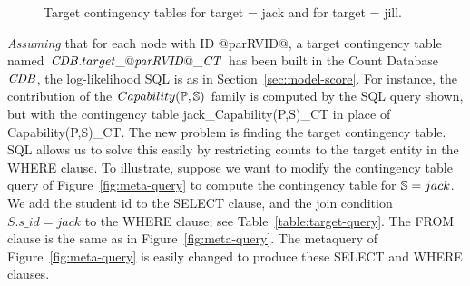 \begin{figure}[htbp] %
 \centering
{} 
\caption{Target contingency tables for target = jack and for target = jill.}
 \label{fig:targetct}
\end{figure}

{\em Assuming} that for each node with ID @parRVID@, a target contingency table named $\CDB.target\_@\it{parRVID}@\_\cttable$ has been built in the Count Database $\CDB$, the log-likelihood SQL is as in Section~\ref{sec:model-score}. For instance, the contribution of the $Capability(\P,\S)$ family is computed by the SQL query shown,  but with the contingency table jack\_Capability(P,S)\_CT in place of Capability(P,S)\_CT.
%
The new problem is finding the target contingency table. SQL allows us to solve this easily by restricting counts to the target entity in the WHERE clause. To illustrate, suppose we want to modify the contingency table query of Figure~\ref{fig:meta-query} to compute the contingency table for $\S = jack$. We add the student id to the SELECT clause, and the join condition $S.s\_id = jack$ to the WHERE clause; see Table~\ref{table:target-query}.%
The FROM clause is the same as in Figure~\ref{fig:meta-query}. The metaquery of Figure~\ref{fig:meta-query} is easily changed to produce these SELECT and WHERE clauses.


